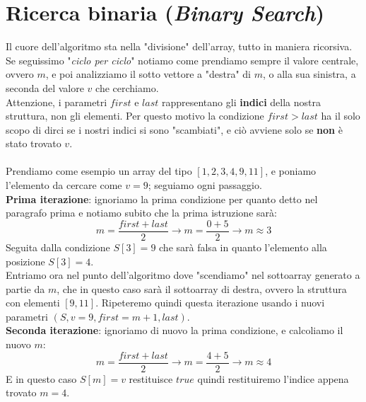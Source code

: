 \documentclass{article}
\begin{document}
\section*{Ricerca binaria (\textit{Binary Search})}

  \vspace{0.3cm}


  \begin{algorithm}[H]
  \caption{Search the value v among the n ordered elements of S}
  \end{algorithm}
  \vspace{0.3cm}

Il cuore dell'algoritmo sta nella "divisione" dell'array, tutto in 
maniera ricorsiva. Se seguissimo "\textit{ciclo per ciclo}" notiamo
come prendiamo sempre il valore centrale, ovvero $m$, e poi 
analizziamo il sotto vettore a "destra" di $m$, o alla sua sinistra,
a seconda del valore $v$ che cerchiamo.
\\
Attenzione, i parametri $first$ e $last$ rappresentano gli 
\textbf{indici} della nostra struttura, non gli elementi. Per questo 
motivo la condizione $first > last$ ha il solo scopo di dirci se i nostri
indici si sono "scambiati", e ciò avviene solo se \textbf{non} è stato 
trovato $v$. 
\\
\\
Prendiamo come esempio un array del tipo $[1,2,3,4,9,11]$, e poniamo l'elemento
da cercare come $v = 9$; seguiamo ogni passaggio. \\
\textbf{Prima iterazione}: ignoriamo la prima condizione per quanto detto 
nel paragrafo prima e notiamo subito che la prima istruzione sarà: 
\[ 
m = \frac{first + last}{2} \rightarrow 
m = \frac{0 + 5}{2} \rightarrow m \approx 3
\]
Seguita dalla condizione $S[3] = 9$ che sarà falsa in quanto l'elemento 
alla posizione $S[3] = 4$. \\
Entriamo ora nel punto dell'algoritmo dove 
"scendiamo" nel sottoarray generato a partie da $m$, che in questo caso
sarà il sottoarray di destra, ovvero la struttura con elementi
$[9, 11]$. Ripeteremo quindi questa iterazione usando i nuovi parametri
$(S, v = 9, first = m + 1, last)$. \\
\textbf{Seconda iterazione}: ignoriamo di nuovo la prima condizione, e 
calcoliamo il nuovo $m$:
\[ 
m = \frac{first + last}{2} \rightarrow 
m = \frac{4 + 5}{2} \rightarrow m \approx 4
\]
E in questo caso $S[m] = v$ restituisce $true$ quindi restituiremo 
l'indice appena trovato $ m = 4$.
\end{document}
